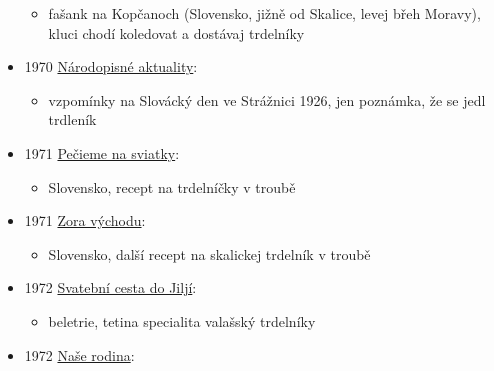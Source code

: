 \begin{itemize}
  \begin{itemize}
  \tightlist
  \item
    fašank na Kopčanoch (Slovensko, jižně od Skalice, levej břeh
    Moravy), kluci chodí koledovat a dostávaj trdelníky
  \end{itemize}
\item
  1970
  \href{https://ceskadigitalniknihovna.cz/view/uuid:733fd410-3b55-11e5-8b04-5ef3fc9bb22f?page=uuid\%3A9992ddf0-3b5b-11e5-a525-5ef3fc9ae867&fulltext=trdeln\%C3\%ADk\%20OR\%20trdeln\%C3\%ADky\%20OR\%20trdeln\%C3\%ADk\%C5\%AF&source=mzk}{Národopisné
  aktuality}:

  \begin{itemize}
  \tightlist
  \item
    vzpomínky na Slovácký den ve Strážnici 1926, jen poznámka, že se
    jedl trdleník
  \end{itemize}
\item
  1971
  \href{https://dikda.snk.sk/uuid/uuid:286ab1e8-9e6d-4d9e-acc5-c7a4ece3b1d4}{Pečieme
  na sviatky}:

  \begin{itemize}
  \tightlist
  \item
    Slovensko, recept na trdelníčky v troubě
  \end{itemize}
\item
  1971
  \href{https://dikda.snk.sk/uuid/uuid:7daf6367-3c66-45b1-95be-b9216087f65a}{Zora
  východu}:

  \begin{itemize}
  \tightlist
  \item
    Slovensko, další recept na skalickej trdelník v troubě
  \end{itemize}
\item
  1972
  \href{https://ceskadigitalniknihovna.cz/view/uuid:7f125360-7a61-11e2-b212-005056827e52?page=uuid:c55826ef-5b0a-c263-256a-4b1ed7dcf198&fulltext=trdeln\%C3\%ADk*\%20OR\%20trdelnjk*&source=mzk}{Svatební
  cesta do Jiljí}:

  \begin{itemize}
  \tightlist
  \item
    beletrie, tetina specialita valašský trdelníky
  \end{itemize}
\item
  1972
  \href{https://ceskadigitalniknihovna.cz/view/uuid:8cf964a0-baf0-11e5-8c9e-001018b5eb5c?page=uuid\%3A13cfe450-bafa-11e5-82dc-5ef3fc9bb22f&fulltext=trdeln\%C3\%ADk\%20OR\%20trdeln\%C3\%ADky\%20OR\%20trdeln\%C3\%ADk\%C5\%AF&source=nkp}{Naše
  rodina}:


\end{itemize}
